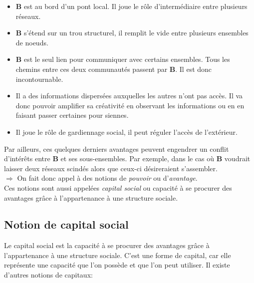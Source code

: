 \begin{itemize}
\item \textbf{B} est au bord d'un pont local. Il joue le rôle d'intermédiaire entre plusieurs réseaux.
\item \textbf{B} s'étend sur un trou structurel, il remplit le vide entre plusieurs ensembles de noeuds.
\item \textbf{B} est le seul lien pour communiquer avec certains ensembles. Tous les chemins entre ces deux communautés passent par \textbf{B}. Il est donc incontournable.
\item Il a des informations dispersées auxquelles les autres n'ont pas accès. Il va donc pouvoir amplifier sa créativité en observant les informations ou en en faisant passer certaines pour siennes.
\item Il joue le rôle de gardiennage social, il peut réguler l'accès de l'extérieur.\\
\end{itemize}

Par ailleurs, ces quelques derniers avantages peuvent engendrer un conflit d'intérêts entre \textbf{B} et ses sous-ensembles. Par exemple, dans le cas où \textbf{B} voudrait laisser deux réseaux scindés alors que ceux-ci désireraient s'assembler.\\

$\Rightarrow$ On fait donc appel à des notions de \textit{pouvoir} ou d'\textit{avantage}.\\

Ces notions sont aussi appelées \textit{capital social} ou capacité à se procurer des avantages grâce à l'appartenance à une structure sociale.

%

\subsection{Notion de capital social}
Le capital social est la capacité à se procurer des avantages grâce à l'appartenance à une structure sociale. C'est une forme de capital, car elle représente une capacité que l'on possède et que l'on peut utiliser.  
Il existe d'autres notions de capitaux:\\

